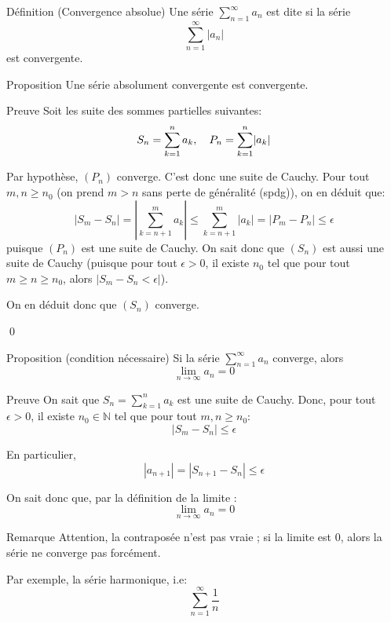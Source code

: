 \documentclass[a4paper]{article}
\begin{document}
\begin{parag}{Définition (Convergence absolue)}
    Une série $\sum_{n = 1}^{\infty} a_n$ est dite  si la série
    \[\sum_{n = 1}^{\infty} \left|a_n\right| \]
    est convergente.
\end{parag}

\begin{parag}{Proposition}
    Une série absolument convergente est convergente.

    \begin{subparag}{Preuve}
        Soit les suite des sommes partielles suivantes:
        \[S_n = \sum_{k=1}^{n} a_k, \mathspace P_n = \sum_{k=1}^{n} \left|a_k\right|\]

        Par hypothèse, $\left(P_n\right)$ converge. C'est donc une suite de Cauchy. Pour tout $m, n \geq n_0$ (on prend $m > n$ sans perte de généralité (spdg)), on en déduit que:
        \[\left|S_m - S_n\right| = \left|\sum_{k=n+1}^{m} a_k\right| \leq \sum_{k=n+1}^{m} \left|a_k\right| = \left|P_m  - P_n\right| \leq \epsilon\]
        puisque $\left(P_n\right)$ est une suite de Cauchy. On sait donc que $\left(S_n\right)$ est aussi une suite de Cauchy (puisque pour tout $\epsilon > 0$, il existe $n_0$ tel que pour tout $m \geq n \geq n_0$, alors $\left|S_m - S_n < \epsilon\right|$).

        On en déduit donc que $\left(S_n\right)$ converge.

        \qed

    \end{subparag}

\end{parag}

\begin{parag}{Proposition (condition nécessaire)}
    Si la série $\sum_{n=1}^{\infty} a_n$ converge, alors
    \[\lim_{n \to \infty} a_n = 0\]

    \begin{subparag}{Preuve}
        On sait que $S_n = \sum_{k=1}^{n} a_k$ est une suite de Cauchy. Donc, pour tout $\epsilon > 0$, il existe $n_0 \in \mathbb{N}$ tel que pour tout $m, n \geq n_0$:
        \[\left|S_m - S_n\right| \leq \epsilon\]

        En particulier,
        \[\left|a_{n+1}\right| = \left|S_{n+1} - S_n\right| \leq \epsilon\]

        On sait donc que, par la définition de la limite :
        \[\lim_{n \to \infty} a_n = 0\]

    \end{subparag}

    \begin{subparag}{Remarque}
        Attention, la contraposée n'est pas vraie ; si la limite est 0, alors la série ne converge pas forcément.

        Par exemple, la série harmonique, i.e:
        \[\sum_{n = 1}^{\infty} \frac{1}{n}\]

    \end{subparag}

\end{parag}
\end{document}
